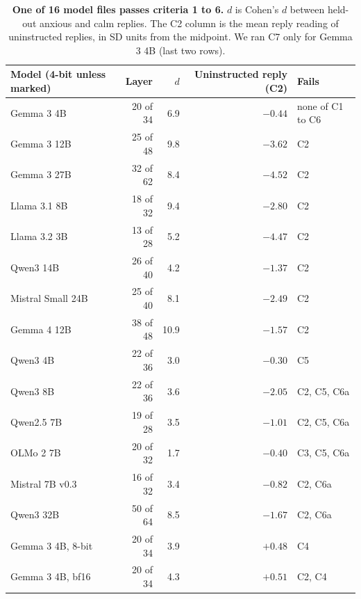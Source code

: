 \begin{table}[t]
\centering\small
\begin{tabular}{lrrrl}
\toprule
Model (4-bit unless marked) & Layer & $d$ & Uninstructed reply (C2) & Fails \\
\midrule
Gemma 3 4B          & 20 of 34 & 6.9  & $-0.44$ & none of C1 to C6 \\
Gemma 3 12B         & 25 of 48 & 9.8  & $-3.62$ & C2 \\
Gemma 3 27B         & 32 of 62 & 8.4  & $-4.52$ & C2 \\
Llama 3.1 8B        & 18 of 32 & 9.4  & $-2.80$ & C2 \\
Llama 3.2 3B        & 13 of 28 & 5.2  & $-4.47$ & C2 \\
Qwen3 14B           & 26 of 40 & 4.2  & $-1.37$ & C2 \\
Mistral Small 24B   & 25 of 40 & 8.1  & $-2.49$ & C2 \\
Gemma 4 12B         & 38 of 48 & 10.9 & $-1.57$ & C2 \\
\midrule
Qwen3 4B            & 22 of 36 & 3.0  & $-0.30$ & C5 \\
Qwen3 8B            & 22 of 36 & 3.6  & $-2.05$ & C2, C5, C6a \\
Qwen2.5 7B          & 19 of 28 & 3.5  & $-1.01$ & C2, C5, C6a \\
OLMo 2 7B           & 20 of 32 & 1.7  & $-0.40$ & C3, C5, C6a \\
Mistral 7B v0.3     & 16 of 32 & 3.4  & $-0.82$ & C2, C6a \\
Qwen3 32B           & 50 of 64 & 8.5  & $-1.67$ & C2, C6a \\
Gemma 3 4B, 8-bit   & 20 of 34 & 3.9  & $+0.48$ & C4 \\
Gemma 3 4B, bf16    & 20 of 34 & 4.3  & $+0.51$ & C2, C4 \\
\bottomrule
\end{tabular}
\caption{\textbf{One of 16 model files passes criteria 1 to 6.} $d$ is Cohen's $d$ between held-out
anxious and calm replies. The C2 column is the mean reply reading of uninstructed replies, in SD
units from the midpoint. We ran C7 only for Gemma 3 4B (last two rows).}
\label{tab:gate0}
\end{table}

